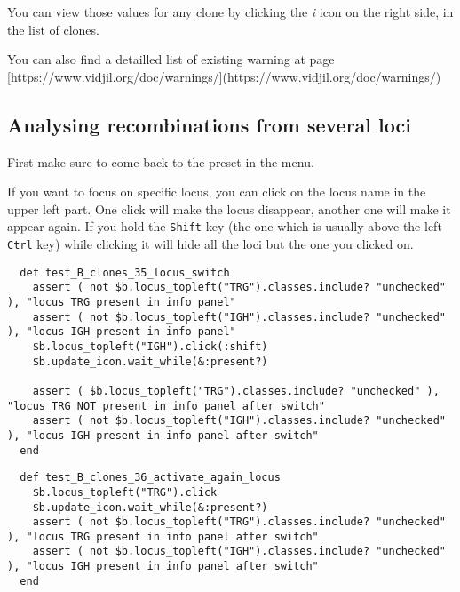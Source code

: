 You can view those values for any clone by clicking the \textit{i} icon on the
right side, in the list of clones.

You can also find a detailled list of existing warning at page [https://www.vidjil.org/doc/warnings/](https://www.vidjil.org/doc/warnings/)

\subsection{Analysing recombinations from several loci}

First make sure to come back to the preset  in the  menu.

If you want to focus on specific locus, you can click on the locus name in
the upper left part. One click will make the locus disappear, another one will
make it appear again.
If you hold the \texttt{Shift} key (the one which is usually above the left
\texttt{Ctrl} key) while clicking it will hide all the loci but the one you
clicked on.

\begin{verbatim}
  def test_B_clones_35_locus_switch
    assert ( not $b.locus_topleft("TRG").classes.include? "unchecked" ), "locus TRG present in info panel"
    assert ( not $b.locus_topleft("IGH").classes.include? "unchecked" ), "locus IGH present in info panel"
    $b.locus_topleft("IGH").click(:shift)
    $b.update_icon.wait_while(&:present?)

    assert ( $b.locus_topleft("TRG").classes.include? "unchecked" ), "locus TRG NOT present in info panel after switch"
    assert ( not $b.locus_topleft("IGH").classes.include? "unchecked" ), "locus IGH present in info panel after switch"
  end
\end{verbatim}

\begin{verbatim}
  def test_B_clones_36_activate_again_locus
    $b.locus_topleft("TRG").click
    $b.update_icon.wait_while(&:present?)
    assert ( not $b.locus_topleft("TRG").classes.include? "unchecked" ), "locus TRG present in info panel after switch"
    assert ( not $b.locus_topleft("IGH").classes.include? "unchecked" ), "locus IGH present in info panel after switch"
  end
\end{verbatim}

